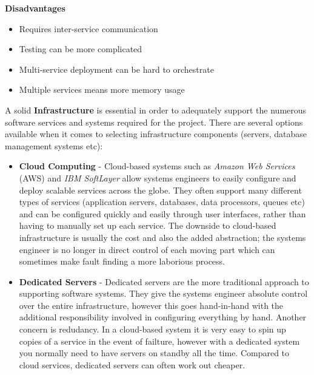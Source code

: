     \textbf{Disadvantages}
    \begin{itemize}
      \item Requires inter-service communication
      \item Testing can be more complicated
      \item Multi-service deployment can be hard to orchestrate
      \item Multiple services means more memory usage
    \end{itemize}
A solid \textbf{Infrastructure} is essential in order to adequately support the numerous software services and systems required for the project. There are several options available when it comes to selecting infrastructure components (servers, database management systems etc):
    \begin{itemize}
      \item \textbf{Cloud Computing} - 
        Cloud-based systems such as \emph{Amazon Web Services} (AWS) and \emph{IBM SoftLayer} allow systems engineers to easily configure and deploy scalable services across the globe. They often support many different types of services (application servers, databases, data processors, queues etc) and can be configured quickly and easily through user interfaces, rather than having to manually set up each service. The downside to cloud-based infrastructure is usually the cost and also the added abstraction; the systems engineer is no longer in direct control of each moving part which can sometimes make fault finding a more laborious process.
      \item \textbf{Dedicated Servers} - 
        Dedicated servers are the more traditional approach to supporting software systems. They give the systems engineer absolute control over the entire infrastructure, however this goes hand-in-hand with the additional responsibility involved in configuring everything by hand. Another concern is redudancy. In a cloud-based system it is very easy to spin up copies of a service in the event of failture, however with a dedicated system you normally need to have servers on standby all the time. Compared to cloud services, dedicated servers can often work out cheaper.
    \end{itemize}
